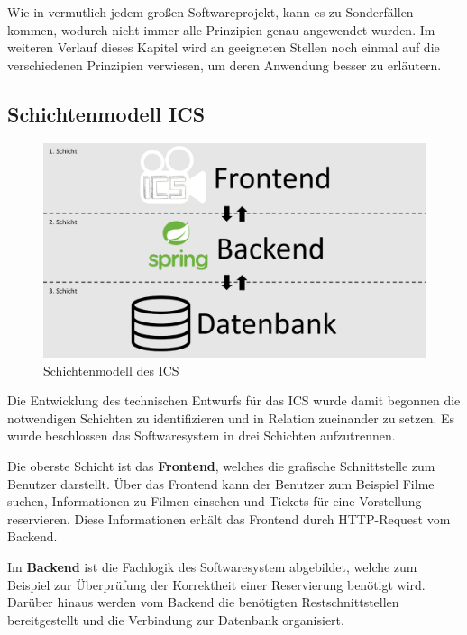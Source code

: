 		Wie in vermutlich jedem großen Softwareprojekt, kann es zu Sonderfällen kommen, wodurch nicht immer alle Prinzipien genau angewendet wurden. Im weiteren Verlauf dieses Kapitel wird an geeigneten Stellen noch einmal auf die verschiedenen Prinzipien verwiesen, um deren Anwendung besser zu erläutern.
		
		\subsection{Schichtenmodell ICS}\label{schichtenmodell}
		
		
		\begin{figure}[H]
			\centering 
			\includegraphics[width=12cm]{img/Schichtenmodell_ICS.pdf}
			\captionsetup{format=hang}
			\caption[Schichtenmodell des ICS]{\label{fig:Schichtenmodell} Schichtenmodell des \ac{ICS} }
		\end{figure}
		
		Die Entwicklung des technischen Entwurfs für das \ac{ICS} wurde damit begonnen die notwendigen Schichten zu identifizieren und in Relation zueinander zu setzen. Es wurde beschlossen das Softwaresystem in drei Schichten aufzutrennen. 
		
		Die oberste Schicht ist das \glqq \textbf{Frontend}\grqq{}, welches die grafische Schnittstelle zum Benutzer darstellt. Über das Frontend kann der Benutzer zum Beispiel Filme suchen, Informationen zu Filmen einsehen und Tickets für eine Vorstellung reservieren. Diese Informationen erhält das Frontend durch HTTP-Request vom Backend.
		
		Im \glqq \textbf{Backend}\grqq{} ist die Fachlogik des Softwaresystem abgebildet, welche zum Beispiel zur Überprüfung der Korrektheit einer Reservierung benötigt wird. Darüber hinaus werden vom Backend die benötigten Restschnittstellen bereitgestellt und die Verbindung zur Datenbank organisiert. 
		
